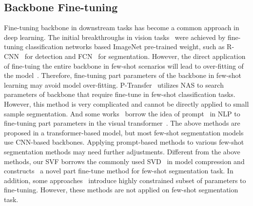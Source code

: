\documentclass{article}
\begin{document}
\subsection{Backbone Fine-tuning}
\vspace{-.4em}
Fine-tuning backbone in downstream tasks has become a common approach in deep learning. The initial breakthroughs in vision tasks~\cite{he2017mask,huang2019ccnet,lin2017focal} were achieved by fine-tuning classification networks based ImageNet pre-trained weight, such as R-CNN~\cite{girshick2015fast} for detection and FCN~\cite{long2015fully} for segmentation. However, the direct application of fine-tuing the entire backbone in few-shot scenarios will lead to over-fitting of the model~\cite{shen2021partial}. Therefore, fine-tuning part parameters of the backbone in few-shot learning may avoid model over-fitting. P-Transfer~\cite{shen2021partial} utilizes NAS to search parameters of backbone that require fine-tune in few-shot classification tasks. However, this method is very complicated and cannot be directly applied to small sample segmentation. And some works~\cite{jia2022visual} borrow the idea of prompt~\cite{tsimpoukelli2021multimodal,shin2020autoprompt,wei2021pretrained} in NLP to fine-tuning part parameters in the visual transformer~\cite{dosovitskiy2020image}. The above methods are proposed in a transformer-based model, but most few-shot segmentation models use CNN-based backbones. Applying prompt-based methods to various few-shot segmentation methods may need further adjustments. Different from the above methods, our SVF borrows the commonly used SVD~\cite{andrews1976singular} in model compression and constructs~\cite{denton2014exploiting, zhuang2018discrimination} a novel part fine-tune method for few-shot segmentation task. In addition, some approaches~\cite{rusu2018meta,requeima2019fast,perez2018film} introduce highly constrained subset of parameters to fine-tuning. However, these methods are not applied on few-shot segmentation task.
\vspace{-.5em}

 
\end{document}
